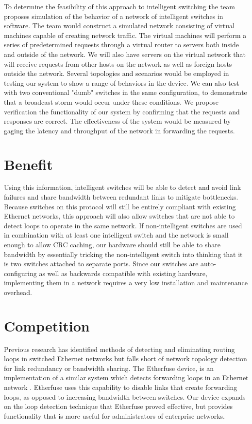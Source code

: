 \documentclass{article}
\begin{document}
	To determine the feasibility of this approach to intelligent switching the team proposes simulation of the behavior of a network of intelligent switches in software.
	The team would construct a simulated network consisting of virtual machines capable of creating network traffic.
	The virtual machines will perform a series of predetermined requests through a virtual router to servers both inside and outside of the network.
	We will also have servers on the virtual network that will receive requests from other hosts on the network as well as foreign hosts outside the network.
	Several topologies and scenarios would be employed in testing our system to show a range of behaviors in the device.
	We can also test with two conventional "dumb" switches in the same configuration, to demonstrate that a broadcast storm would occur under these conditions.
	We propose verification the functionality of our system by confirming that the requests and responses are correct.
	The effectiveness of the system would be measured by gaging the latency and throughput of the network in forwarding the requests.
\section{Benefit}
	Using this information, intelligent switches will be able to detect and avoid link failures and share bandwidth between redundant links to mitigate bottlenecks.
	Because switches on this protocol will still be entirely compliant with existing Ethernet networks, this approach will also allow switches that are not able to detect loops to operate in the same network.
	If non-intelligent switches are used in combination with at least one intelligent switch and the network is small enough to allow CRC caching, our hardware should still be able to share bandwidth by essentially tricking the non-intelligent switch into thinking that it is two switches attached to separate ports.
	Since our switches are auto-configuring as well as backwards compatible with existing hardware, implementing them in a network requires a very low installation and maintenance overhead.
\section{Competition}
	Previous research has identified methods of detecting and eliminating routing loops in switched Ethernet networks but falls short of network topology detection for link redundancy or bandwidth sharing.
	The Etherfuse device, is an implementation of a similar system which detects forwarding loops in an Ethernet network \cite{etherfuse}.
	Etherfuse uses this capability to disable links that create forwarding loops, as opposed to increasing bandwidth between switches.
	Our device expands on the loop detection technique that Etherfuse proved effective, but provides functionality that is more useful for administrators of enterprise networks.
	
\end{document}
